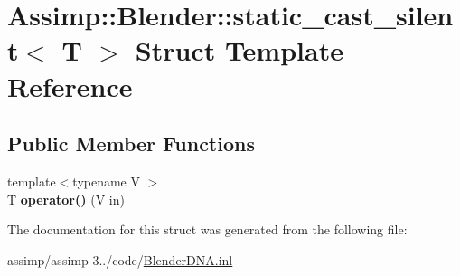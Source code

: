 \hypertarget{struct_assimp_1_1_blender_1_1static__cast__silent}{\section{Assimp\+:\+:Blender\+:\+:static\+\_\+cast\+\_\+silent$<$ T $>$ Struct Template Reference}
\label{struct_assimp_1_1_blender_1_1static__cast__silent}
}
\subsection*{Public Member Functions}
\begin{DoxyCompactItemize}
\item 
\hypertarget{struct_assimp_1_1_blender_1_1static__cast__silent_a507855b57e5c14e314e4e4e6f662f4fc}{{\footnotesize template$<$typename V $>$ }\\T {\bfseries operator()} (V in)}\label{struct_assimp_1_1_blender_1_1static__cast__silent_a507855b57e5c14e314e4e4e6f662f4fc}

\end{DoxyCompactItemize}


The documentation for this struct was generated from the following file\+:\begin{DoxyCompactItemize}
\item 
assimp/assimp-\/3../code/\hyperlink{_blender_d_n_a_8inl}{Blender\+D\+N\+A.\+inl}\end{DoxyCompactItemize}
